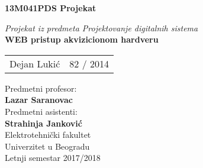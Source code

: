 	
\thispagestyle{empty}
\noindent
\noindent
\begin{center}
	\textup{\small {\bf 13M041PDS Projekat}}\\[0.2in]
	\vspace{2.5in}

	\emph{Projekat iz predmeta Projektovanje digitalnih sistema}\\
	
	\Large {\textbf {WEB pristup akvizicionom hardveru }}\\[2in]
	

	\vspace{0.5in}
	\begin{table}[h]
		\centering
		\begin{tabular}{lr}
			Dejan Lukić & 82 / 2014 \\
		\end{tabular}
	\end{table}
	
	\vspace{0.1in}
	Predmetni profesor:\\
	{\textbf{Lazar Saranovac}}\\
	Predmetni asistenti:\\
	{\textbf{Strahinja Janković}}\\
	\vspace{0.5in}	
		\Large{Elektrotehni\v cki fakultet}\\
	\normalsize
	Univerzitet u Beogradu \\
	
	Letnji semestar 2017/2018
	
	\vfill
	
\end{center}

\pagebreak